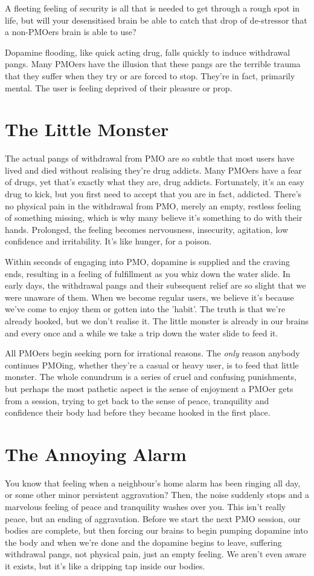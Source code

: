 \documentclass[easypeasy.tex]{subfiles}
\begin{document}
A fleeting feeling of security is all that is needed to get through a rough spot in life, but will your desensitised brain be able to catch that drop of de-stressor that a non-PMOers brain is able to use?

Dopamine flooding, like quick acting drug, falls quickly to induce withdrawal pangs. Many PMOers have the illusion that these pangs are the terrible trauma that they suffer when they try or are forced to stop. They're in fact, primarily mental. The user is feeling deprived of their pleasure or prop.

\section{The Little Monster}
The actual pangs of withdrawal from PMO are so subtle that most users have lived and died without realising they're drug addicts. Many PMOers have a fear of drugs, yet that's exactly what they are, drug addicts. Fortunately, it's an easy drug to kick, but you first need to accept that you are in fact, addicted. There's no physical pain in the withdrawal from PMO, merely an empty, restless feeling of something missing, which is why many believe it's something to do with their hands. Prolonged, the feeling becomes nervousness, insecurity, agitation, low confidence and irritability. It's like hunger, for a poison.

Within seconds of engaging into PMO, dopamine is supplied and the craving ends, resulting in a feeling of fulfillment as you whiz down the water slide. In early days, the withdrawal pangs and their subsequent relief are so slight that we were unaware of them. When we become regular users, we believe it's because we've come to enjoy them or gotten into the 'habit'. The truth is that we're already hooked, but we don't realise it. The little monster is already in our brains and every once and a while we take a trip down the water slide to feed it.

All PMOers begin seeking porn for irrational reasons. The \textit{only} reason anybody continues PMOing, whether they're a casual or heavy user, is to feed that little monster. The whole conundrum is a series of cruel and confusing punishments, but perhaps the most pathetic aspect is the sense of enjoyment a PMOer gets from a session, trying to get back to the sense of peace, tranquility and confidence their body had before they became hooked in the first place.

\section{The Annoying Alarm}
You know that feeling when a neighbour's home alarm has been ringing all day, or some other minor persistent aggravation? Then, the noise suddenly stops and a marvelous feeling of peace and tranquility washes over you. This isn't really peace, but an ending of aggravation. Before we start the next PMO session, our bodies are complete, but then forcing our brains to begin pumping dopamine into the body and when we're done and the dopamine begins to leave, suffering withdrawal pangs, not physical pain, just an empty feeling. We aren't even aware it exists, but it's like a dripping tap inside our bodies.
\end{document}
